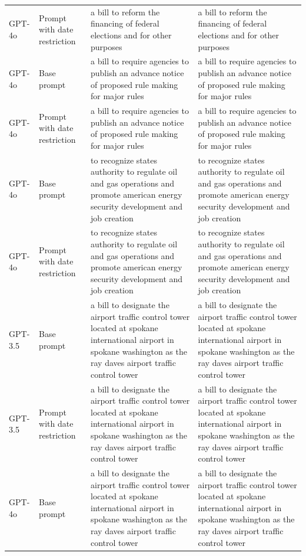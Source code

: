 \begin{longtable}{>{\raggedright\arraybackslash}p{1.4cm}>{\raggedright\arraybackslash}p{1.4cm}>{\raggedright\arraybackslash}p{5.5cm}>{\raggedright\arraybackslash}p{5.5cm}}
GPT-4o & Prompt with date restriction & a bill to reform the financing of federal elections and for other purposes & a bill to reform the financing of federal elections and for other purposes\\
GPT-4o & Base prompt & a bill to require agencies to publish an advance notice of proposed rule making for major rules & a bill to require agencies to publish an advance notice of proposed rule making for major rules\\
GPT-4o & Prompt with date restriction & a bill to require agencies to publish an advance notice of proposed rule making for major rules & a bill to require agencies to publish an advance notice of proposed rule making for major rules\\
GPT-4o & Base prompt & to recognize states authority to regulate oil and gas operations and promote american energy security development and job creation & to recognize states authority to regulate oil and gas operations and promote american energy security development and job creation\\
GPT-4o & Prompt with date restriction & to recognize states authority to regulate oil and gas operations and promote american energy security development and job creation & to recognize states authority to regulate oil and gas operations and promote american energy security development and job creation\\
GPT-3.5 & Base prompt & a bill to designate the airport traffic control tower located at spokane international airport in spokane washington as the ray daves airport traffic control tower & a bill to designate the airport traffic control tower located at spokane international airport in spokane washington as the ray daves airport traffic control tower\\
GPT-3.5 & Prompt with date restriction & a bill to designate the airport traffic control tower located at spokane international airport in spokane washington as the ray daves airport traffic control tower & a bill to designate the airport traffic control tower located at spokane international airport in spokane washington as the ray daves airport traffic control tower\\
GPT-4o & Base prompt & a bill to designate the airport traffic control tower located at spokane international airport in spokane washington as the ray daves airport traffic control tower & a bill to designate the airport traffic control tower located at spokane international airport in spokane washington as the ray daves airport traffic control tower\\

\end{longtable}
